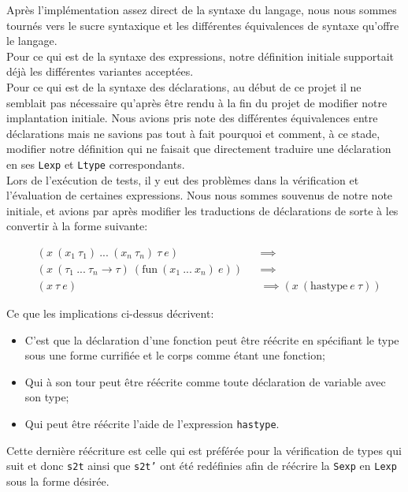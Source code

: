 \documentclass[10pt, titlepage]{article}
\begin{document}
Après l'implémentation assez direct de la syntaxe du langage, nous nous sommes
tournés vers le sucre syntaxique et les différentes équivalences de syntaxe
qu'offre le langage. \\

Pour ce qui est de la syntaxe des expressions, notre définition initiale
supportait déjà les différentes variantes acceptées. \\

Pour ce qui est de la syntaxe des déclarations, au début de ce projet il ne
semblait pas nécessaire qu'après être rendu à la fin du projet de modifier
notre implantation initiale. Nous avions pris note des différentes équivalences
entre déclarations mais ne savions pas tout à fait pourquoi et comment, à ce
stade, modifier notre définition qui ne faisait que directement traduire une
déclaration en ses \texttt{Lexp} et \texttt{Ltype} correspondants. \\
Lors de l'exécution de tests, il y eut des problèmes dans la vérification et
l'évaluation de certaines expressions. Nous nous sommes souvenus de notre note
initiale, et avions par après modifier les traductions de déclarations de sorte
à les convertir à la forme suivante:

\begin{equation*}
    \begin{aligned}
        & (x \ (x_1 \ \tau_1) \ ... \ (x_n \ \tau_n) \ \tau \ e) && \implies \\
        & (x \ (\tau_1 \ ... \ \tau_n \rightarrow \tau) \ (\text{fun} \
            (x_1 \ ... \ x_n) \ e)) && \implies \\
        & (x \ \tau \ e) && \implies (x \ (\text{hastype} \ e \ \tau))
    \end{aligned}
\end{equation*}

Ce que les implications ci-dessus décrivent:

\begin{itemize}
    \item C'est que la déclaration d'une fonction peut être réécrite en
    spécifiant le type sous une forme currifiée et le corps comme étant une
    fonction;
    \item Qui à son tour peut être réécrite comme toute déclaration de variable
    avec son type;
    \item Qui peut être réécrite l'aide de l'expression \texttt{hastype}.
\end{itemize}
Cette dernière réécriture est celle qui est préférée pour la vérification de
types qui suit et donc \texttt{s2t} ainsi que \texttt{s2t'} ont été redéfinies
afin de réécrire la \texttt{Sexp} en \texttt{Lexp} sous la forme désirée.
\end{document}
